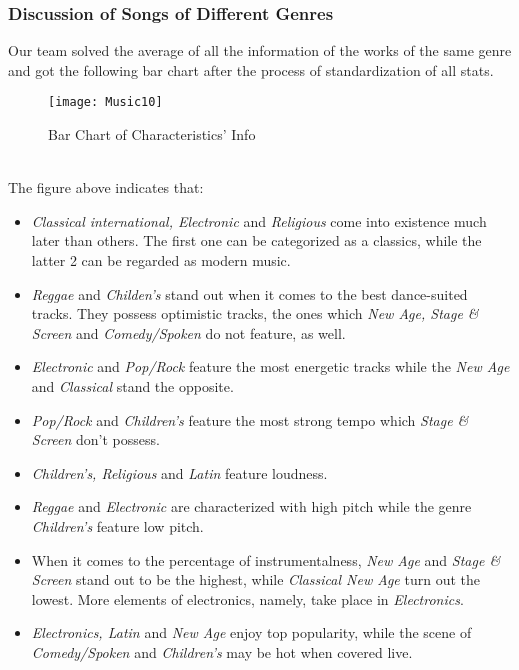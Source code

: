 \documentclass[12pt]{article}
\begin{document}
{{\subsubsection{Discussion of Songs of Different Genres}
Our team solved the average of all the information of the works of the same genre and got the following bar chart after the process of standardization of all stats.
\begin{figure}[h]
	\centering
	\texttt{[image: Music10]}
	\caption{Bar Chart of Characteristics' Info}
\end{figure}\\
The figure above indicates that:
\begin{itemize}
	\item {\textit{Classical international, Electronic}} and {\textit{Religious}} come into existence much later than others. The first one can be categorized as a classics, while the latter 2 can be regarded as modern music.
	\item {\textit{Reggae}} and {\textit{Childen's}} stand out when it comes to the best dance-suited tracks. They possess optimistic tracks, the ones which {\textit{New Age, Stage \& Screen}} and {\textit{Comedy/Spoken}} do not feature, as well.
	\item {\textit{Electronic}} and {\textit{Pop/Rock}} feature the most energetic tracks while the {\textit{New Age}} and {\textit{Classical}} stand the opposite.
	\item {\textit{Pop/Rock}} and {\textit{Children's}} feature the most strong tempo which {\textit{Stage \& Screen}} don't possess.
	\item {\textit{Children's, Religious}} and {\textit{Latin}} feature loudness.
	\item {\textit{Reggae}} and {\textit{Electronic}} are characterized with high pitch while the genre {\textit{Children's}} feature low pitch.
	\item When it comes to the percentage of instrumentalness, {\textit{New Age}} and {\textit{Stage \& Screen}} stand out to be the highest, while {\textit{Classical New Age}} turn out the lowest. More elements of electronics, namely, take place in {\textit{Electronics}}.
	\item {\textit{Electronics, Latin}} and {\textit{New Age}} enjoy top popularity, while the scene of {\textit{Comedy/Spoken}} and {\textit{Children's}} may be hot when covered live.
\end{itemize}
}}
\end{document}

